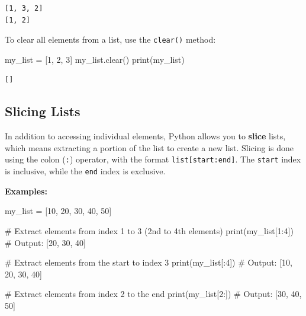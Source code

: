 \documentclass[
  letterpaper,
  DIV=11,
  numbers=noendperiod]{scrreprt}
\newenvironment{Shaded}{\begin{snugshade}}{\end{snugshade}}
\newcommand{\BuiltInTok}[1]{\textcolor[rgb]{0.00,0.23,0.31}{#1}}
\newcommand{\CommentTok}[1]{\textcolor[rgb]{0.37,0.37,0.37}{#1}}
\newcommand{\DecValTok}[1]{\textcolor[rgb]{0.68,0.00,0.00}{#1}}
\newcommand{\NormalTok}[1]{\textcolor[rgb]{0.00,0.23,0.31}{#1}}
\newcommand{\OperatorTok}[1]{\textcolor[rgb]{0.37,0.37,0.37}{#1}}
\begin{document}
\begin{verbatim}
[1, 3, 2]
[1, 2]
\end{verbatim}

To clear all elements from a list, use the \texttt{clear()} method:

\begin{Shaded}
\begin{Highlighting}[]
\NormalTok{my\_list }\OperatorTok{=}\NormalTok{ [}\DecValTok{1}\NormalTok{, }\DecValTok{2}\NormalTok{, }\DecValTok{3}\NormalTok{]}
\NormalTok{my\_list.clear()}
\BuiltInTok{print}\NormalTok{(my\_list)}
\end{Highlighting}
\end{Shaded}

\begin{verbatim}
[]
\end{verbatim}

\hypertarget{slicing-lists}{%
\subsection{Slicing Lists}\label{slicing-lists}}

In addition to accessing individual elements, Python allows you to
\textbf{slice} lists, which means extracting a portion of the list to
create a new list. Slicing is done using the colon (\texttt{:})
operator, with the format \texttt{list{[}start:end{]}}. The
\texttt{start} index is inclusive, while the \texttt{end} index is
exclusive.

\textbf{Examples:}

\begin{Shaded}
\begin{Highlighting}[]
\NormalTok{my\_list }\OperatorTok{=}\NormalTok{ [}\DecValTok{10}\NormalTok{, }\DecValTok{20}\NormalTok{, }\DecValTok{30}\NormalTok{, }\DecValTok{40}\NormalTok{, }\DecValTok{50}\NormalTok{]}

\CommentTok{\# Extract elements from index 1 to 3 (2nd to 4th elements)}
\BuiltInTok{print}\NormalTok{(my\_list[}\DecValTok{1}\NormalTok{:}\DecValTok{4}\NormalTok{])  }\CommentTok{\# Output: [20, 30, 40]}

\CommentTok{\# Extract elements from the start to index 3}
\BuiltInTok{print}\NormalTok{(my\_list[:}\DecValTok{4}\NormalTok{])  }\CommentTok{\# Output: [10, 20, 30, 40]}

\CommentTok{\# Extract elements from index 2 to the end}
\BuiltInTok{print}\NormalTok{(my\_list[}\DecValTok{2}\NormalTok{:])  }\CommentTok{\# Output: [30, 40, 50]}
\end{Highlighting}
\end{Shaded}
\end{document}
